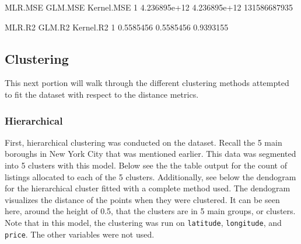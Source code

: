 \documentclass[11pt, a4paper]{article}
\begin{document}
\begin{Schunk}
\begin{Soutput}
       MLR.MSE      GLM.MSE   Kernel.MSE
1 4.236895e+12 4.236895e+12 131586687935
\end{Soutput}
\begin{Soutput}
     MLR.R2    GLM.R2 Kernel.R2
1 0.5585456 0.5585456 0.9393155
\end{Soutput}
\end{Schunk}



\pagebreak
\subsection{Clustering}

This next portion will walk through the different clustering methods attempted to fit the dataset with respect to the distance metrics.

\subsubsection{Hierarchical}

First, hierarchical clustering was conducted on the dataset. Recall the 5 main boroughs in New York City that was mentioned earlier. This data was segmented into 5 clusters with this model. Below see the the table output for the count of listings allocated to each of the 5 clusters. Additionally, see below the dendogram for the hierarchical cluster fitted with a complete method used. The dendogram visualizes the distance of the points when they were clustered. It can be seen here, around the height of 0.5, that the clusters are in 5 main groups, or clusters. Note that in this model, the clustering was run on \texttt{latitude}, \texttt{longitude}, and  \texttt{price}. The other variables were not used.
\end{document}
